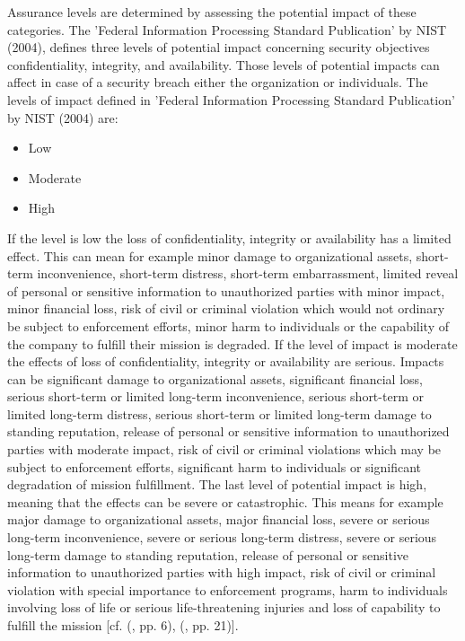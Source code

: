Assurance levels are determined by assessing the potential impact of these categories. The 'Federal Information Processing Standard Publication' by NIST (2004), defines three levels of potential impact concerning security objectives confidentiality, integrity, and availability. Those levels of potential impacts can affect in case of a security breach either the organization or individuals. The levels of impact defined in 'Federal Information Processing Standard Publication' by NIST (2004) are:

\begin{itemize}
	\item Low
	\item Moderate
	\item High
\end{itemize}


If the level is low the loss of confidentiality, integrity or availability has a limited effect. This can mean for example minor damage to organizational assets, short-term inconvenience, short-term distress, short-term embarrassment, limited reveal of personal or sensitive information to unauthorized parties with minor impact, minor financial loss, risk of civil or criminal violation which would not ordinary be subject to enforcement efforts, minor harm to individuals or the capability of the company to fulfill their mission is degraded. If the level of impact is moderate the effects of loss of confidentiality, integrity or availability are serious. Impacts can be significant damage to organizational assets, significant financial loss, serious short-term or limited long-term inconvenience,  serious short-term or limited long-term distress,  serious short-term or limited long-term damage to standing reputation, release of personal or sensitive information to unauthorized parties with moderate impact, risk of civil or criminal violations which may be subject to enforcement efforts, significant harm to individuals or significant degradation of mission fulfillment. The last level of potential impact is high, meaning that the effects can be severe or catastrophic. This means for example major damage to organizational assets, major financial loss, severe or serious long-term inconvenience, severe or serious long-term distress, severe or serious long-term damage to standing reputation, release of personal or sensitive information to unauthorized parties with high impact, risk of civil or criminal violation with special importance to enforcement programs, harm to individuals involving loss of life or serious life-threatening injuries and loss of capability to fulfill the mission [cf. (\cite{NIST:2004:FIOPS}, pp. 6), (\cite{NIST:2017:DIG}, pp. 21)].



